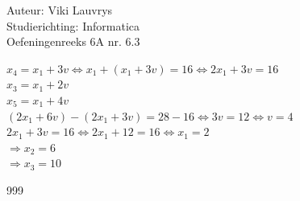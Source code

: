 \documentclass[a4paper]{article}
\begin{document}
  
\noindent \large Auteur: Viki	Lauvrys \\
\noindent \large Studierichting: Informatica\\
\noindent \large Oefeningenreeks 6A nr. 6.3\\

\medskip

\normalsize

$ x_4  = x_1 + 3v \Leftrightarrow x_1 + (x_1 +3v) = 16 \Leftrightarrow 2x_1 +3v = 16 $ \\

$ x_3 = x_1 + 2v $ \\

$ x_5 = x_1 + 4v $ \\

$ (2x_1 +6v) - (2x_1 +3v) = 28 -16 \Leftrightarrow 3v = 12 \Leftrightarrow v = 4 $ \\

$ 2x_1 +3v = 16 \Leftrightarrow 2x_1 + 12 = 16 \Leftrightarrow x_1 = 2 $\\

$ \Rightarrow x_2 = 6 $ \\

$ \Rightarrow x_3 = 10 $ \\

\begin{thebibliography}{999}
\end{thebibliography}
\end{document}
